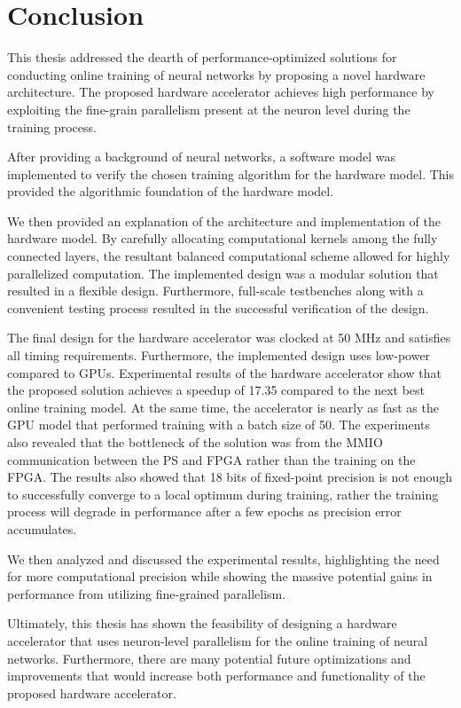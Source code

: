 \chapter{Conclusion}\label{conclusion}
This thesis addressed the dearth of performance-optimized solutions for conducting online training of neural networks by proposing a novel hardware architecture. The proposed hardware accelerator achieves high performance by exploiting the fine-grain parallelism present at the neuron level during the training process.

After providing a background of neural networks, a software model was implemented to verify the chosen training algorithm for the hardware model. This provided the algorithmic foundation of the hardware model.

We then provided an explanation of the architecture and implementation of the hardware model. By carefully allocating computational kernels among the fully connected layers, the resultant balanced computational scheme allowed for highly parallelized computation. The implemented design was a modular solution that resulted in a flexible design. Furthermore, full-scale testbenches along with a convenient testing process resulted in the successful verification of the design.

The final design for the hardware accelerator was clocked at 50 MHz and satisfies all timing requirements. Furthermore, the implemented design uses low-power compared to GPUs. Experimental results of the hardware accelerator show that the proposed solution achieves a speedup of 17.35 compared to the next best online training model. At the same time, the accelerator is nearly as fast as the GPU model that performed training with a batch size of 50. The experiments also revealed that the bottleneck of the solution was from the MMIO communication between the PS and FPGA rather than the training on the FPGA. The results also showed that 18 bits of fixed-point precision is not enough to  successfully converge to a local optimum during training, rather the training process will degrade in performance after a few epochs as precision error accumulates. 

We then analyzed and discussed the experimental results, highlighting the need for more computational precision while showing the massive potential gains in performance from utilizing fine-grained parallelism. 

Ultimately, this thesis has shown the feasibility of designing a hardware accelerator that uses neuron-level parallelism for the online training of neural networks. Furthermore, there are many potential future optimizations and improvements that would increase both performance and functionality of the proposed hardware accelerator.